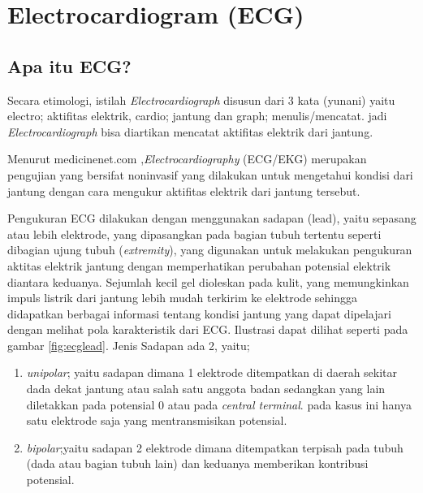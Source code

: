 \section{Electrocardiogram (ECG)}
\label{sec:ecg}

\subsection{Apa itu ECG?}

Secara etimologi, istilah \textit{Electrocardiograph} disusun dari 3 kata
(yunani) yaitu electro; aktifitas elektrik, cardio; jantung dan graph;
menulis/mencatat. jadi \textit{Electrocardiograph} bisa diartikan mencatat
aktifitas elektrik dari jantung.

Menurut medicinenet.com \cite{medicinenet.1},\textit{Electrocardiography}
(ECG/EKG) merupakan pengujian yang bersifat noninvasif yang dilakukan untuk
mengetahui kondisi dari jantung dengan cara mengukur aktifitas elektrik dari
jantung tersebut.
 

Pengukuran ECG dilakukan dengan menggunakan sadapan (lead), yaitu sepasang atau
lebih elektrode, yang dipasangkan pada bagian tubuh tertentu seperti dibagian
ujung tubuh (\textit{extremity}), yang digunakan untuk melakukan pengukuran
aktitas elektrik jantung dengan memperhatikan perubahan potensial  elektrik
diantara keduanya. Sejumlah kecil gel dioleskan pada
kulit,  yang memungkinkan impuls listrik dari jantung lebih mudah terkirim ke
elektrode sehingga didapatkan berbagai informasi tentang
kondisi jantung yang dapat dipelajari dengan melihat pola karakteristik dari
ECG. Ilustrasi dapat dilihat seperti pada gambar \ref{fig:ecglead}. 
\noindent Jenis Sadapan ada 2, yaitu;
\begin{enumerate}
   \item \textit{unipolar}; yaitu sadapan dimana 1 elektrode ditempatkan di
   daerah sekitar dada dekat jantung atau salah satu anggota badan sedangkan
   yang lain diletakkan pada potensial 0 atau pada \textit{central terminal}.
   pada kasus ini hanya satu elektrode saja yang mentransmisikan potensial.

   \item \textit{bipolar};yaitu sadapan 2 elektrode dimana ditempatkan terpisah
   pada tubuh (dada atau bagian tubuh lain) dan keduanya memberikan kontribusi 
   potensial.
\end{enumerate}

